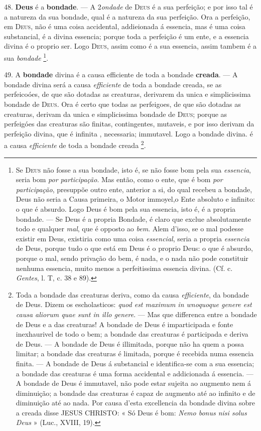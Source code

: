 48. \textbf{Deus} é a \textbf{bondade}. --- A 2\emph{ondade} de \textsc{Deus} é a sua perfeição; e por isso tal é a natureza da sua bondade, qual é a natureza da sua perfeição. Ora a perfeição, em \textsc{Deus}, não é uma coisa accidental, addieionada á essencia, mas é uma coisa substancial, é a divina essencia; porque toda a perfeição é um ente, e a essencia divina é o proprio ser. Logo \textsc{Deus}, assim como é a sua essencia, assim tambem é a sua \emph{bondade} \footnote{Se \textsc{Deus} não fosse a sua bondade, isto é, se não fosse bom pela sua \emph{essencia}, seria bom \emph{por participação}. Mas então, como o ente, que é bom \emph{por participação}, presuppõe outro ente, anterior a si, do qual recebeu a bondade, Deus não seria a Causa primeira, o Motor immoyel,o Ente absoluto e infinito: o que é absurdo. Logo Deus é bom pela sua essencia, isto é, é a propria bondade. --- Se Deus é a propria Bondade, é claro que exclue absolutamente todo e qualquer \emph{mal}, que é opposto ao \emph{bem}. Alem d'isso, se o mal podesse existir em Deus, existiria como uma coisa \emph{essencial}, seria a propria \emph{essencia} de Deus, porque tudo o que está em Deus é o proprio Deus: o que é absurdo, porque o mal, sendo privação do bem, é nada, e o nada não pode constituir nenhuma essencia, muito menos a perfeitissima essencia divina. (Cf. c. \emph{Gentes}, l. T, c. 38 e 89).}.

49. A \textbf{bondade} divina é a causa efficiente de toda a bondade \textbf{creada}. --- A bondade divina será a causa \emph{efficiente} de toda a bondade creada, se as perfeicoóes, de que são dotadas as creaturas, derivarem da unica e simplicissima bondade de \textsc{Deus}. Ora é certo que todas as perfeigoes, de que são dotadas as creaturas, derivam da unica e simplicissima bondade de \textsc{Deus}; porque as perfeigóes das creaturas são finitas, contingentes, mutaveis, e por isso derivam da perfeição divina, que é infinita  , necessaria; immutavel. Logo a bondade divina. é a causa \emph{efficiente} de toda a bondade creada \footnote{Toda a bondade das creaturas deriva, como da causa \emph{efficiente}, da bondade de Deus. Dizem os escholasticos: \emph{quod est maximum in wnoquoque genere est causa aliorum quae sunt in illo genere}. --- Mas que differenca entre a bondade de Deus e a das creaturas! A bondade de Deus é imparticipada e fonte inexhaurivel de todo o bem; a bondade das creaturas é participada e deriva de Deus. --- A bondade de Deus é illimitada, porque não ha quem a possa limitar; a bondade das creaturas é limitada, porque é recebida numa essencia finita. --- A bondade de Deus á substancial e identifica-se com a sua essencia; a bondade das creaturas é uma forma accidental e addicionada á essencia. --- A bondade de Deus é immutavel, não pode estar sujeita ao augmento nem á diminuição; a bondade das creaturas é capaz de augmento até ao infinito e de diminuição até ao nada. Por causa d'esta excellencia da bondade divina sobre a creada disse \textsc{JESUS CHRISTO}: « Só Deus é bom: \emph{Nemo bonus nisi solus Deus} » (Luc., XVIII, 19).}.

